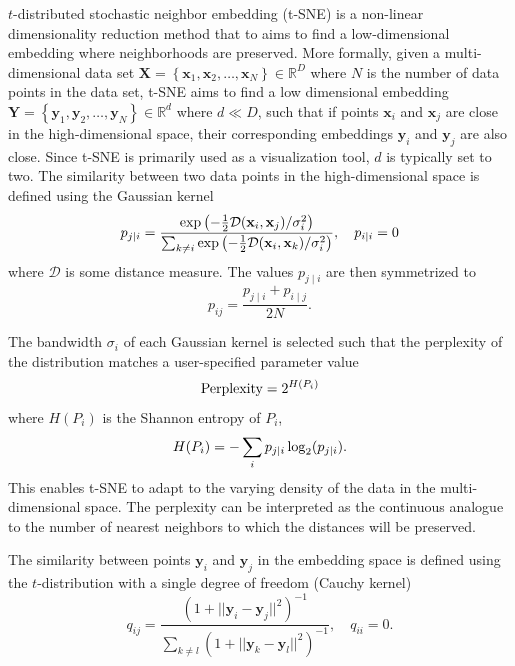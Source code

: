 \documentclass[article]{jss}
\begin{document}
$t$-distributed stochastic neighbor embedding (t-SNE) is a non-linear
dimensionality reduction method that to aims to find a low-dimensional embedding
where neighborhoods are preserved. More formally, given a multi-dimensional data set
$\mathbf{X} = \left \{ \mathbf{x}_1, \mathbf{x}_2, \dots, \mathbf{x}_N \right \}
\in \mathbb{R}^D$ where $N$ is the number of data points in the data set, t-SNE
aims to find a low dimensional embedding $\mathbf{Y} = \left \{ \mathbf{y}_1,
\mathbf{y}_2, \dots, \mathbf{y}_N \right\} \in \mathbb{R}^d$ where $d \ll D$,
such that if points $\mathbf{x}_i$ and $\mathbf{x}_j$ are close in the
high-dimensional space, their corresponding embeddings $\mathbf{y}_i$ and
$\mathbf{y}_j$ are also close. Since t-SNE is primarily used as a visualization
tool, $d$ is typically set to two. The similarity between two data points in the
high-dimensional space is defined using the Gaussian kernel
\begin{equation}
p_{j \mid i} = \frac{\exp \left ( -\frac{1}{2} \mathcal{D}(\mathbf{x}_i, \mathbf{x}_j ) / \sigma_i^2 \right )}
{\sum_{k \neq i } \exp \left ( -\frac{1}{2} \mathcal{D}(\mathbf{x}_i, \mathbf{x}_k ) / \sigma_i^2 \right )}, \quad p_{i \mid i} = 0 \notag
\label{eq:gaussian_kernel}
\end{equation}
where $\mathcal{D}$ is some distance measure. The values $p_{j \mid i}$
are then symmetrized to
\begin{equation}
p_{ij} = \frac{p_{j \mid i} + p_{i \mid j}}{2N}.
\label{eq:symmetrize}
\end{equation}

The bandwidth $\sigma_i$ of each Gaussian kernel is selected such that the perplexity of the distribution matches a user-specified parameter value
\begin{equation}
\text{Perplexity} = 2^{H(P_i)} \notag
\end{equation}
where $H(P_i)$ is the Shannon entropy of $P_i$,
\begin{equation}
H(P_i) = -\sum_i p_{j \mid i} \log_2 (p_{j \mid i}). \notag
\end{equation}
This enables t-SNE to adapt to the varying density of the data in the
multi-dimensional space. The perplexity can be interpreted as the continuous
analogue to the number of nearest neighbors to which the distances will be
preserved. 

The similarity between points $\mathbf{y}_i$ and $\mathbf{y}_j$ in the embedding
space is defined using the $t$-distribution with a single degree of freedom
(Cauchy kernel)
\begin{equation}
q_{ij} = \frac{\left ( 1 + || \mathbf{y}_i - \mathbf{y}_j ||^2 \right )^{-1}}
{\sum_{k \neq l}\left ( 1 + || \mathbf{y}_k - \mathbf{y}_l ||^2 \right )^{-1}},
\quad q_{ii} = 0.
\label{eq:cauchy_kernel}
\end{equation}
\end{document}
